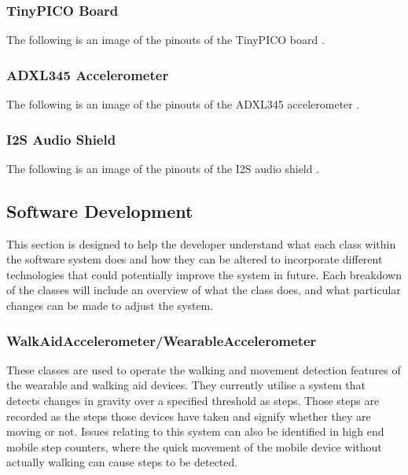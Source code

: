 			\subsubsection{TinyPICO Board}

				The following is an image of the pinouts of the TinyPICO board \cite{tinypico}.

				

			\newpage
			\subsubsection{ADXL345 Accelerometer}

				The following is an image of the pinouts of the ADXL345 accelerometer \cite{components101}.

				

			\newpage
			\subsubsection{I2S Audio Shield}

				The following is an image of the pinouts of the I2S audio shield \cite{unexpected_maker}.

				

		\newpage
		\subsection{Software Development}

			This section is designed to help the developer understand what each class within the software system does and how they can be altered to incorporate different technologies that could potentially improve the system in future. Each breakdown of the classes will include an overview of what the class does, and what particular changes can be made to adjust the system.

			\subsubsection{WalkAidAccelerometer/WearableAccelerometer}

				These classes are used to operate the walking and movement detection features of the wearable and walking aid devices. They currently utilise a system that detects changes in gravity over a specified threshold as steps. Those steps are recorded as the steps those devices have taken and signify whether they are moving or not. Issues relating to this system can also be identified in high end mobile step counters, where the quick movement of the mobile device without actually walking can cause steps to be detected.

